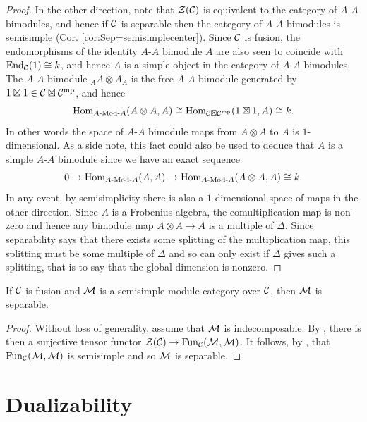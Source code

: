 \documentclass{amsart}
\begin{document}
\begin{proof}
In the other direction, note that $\mathcal Z(\mathcal C)$ is equivalent to the category of $A$-$A$ bimodules, and hence if $\mathcal C$ is separable then the category of $A$-$A$ bimodules is semisimple (Cor. \ref{cor:Sep=semisimplecenter}). 
Since $\mathcal C$ is fusion, the endomorphisms of the identity $A$-$A$ bimodule $A$ are also seen to coincide with $\operatorname{End}_{\mathcal C}(1) \cong k$, and hence $A$ is a simple object in the category of $A$-$A$ bimodules. 
The $A$-$A$ bimodule ${}_AA \otimes A_A$ is the free $A$-$A$ bimodule generated by $1 \boxtimes 1 \in \mathcal C \boxtimes \mathcal C^{\mathrm{mp}}$, and hence
\begin{equation*}
	\Hom_{\Mod{A}{A}}(A \otimes A, A) \cong \Hom_{\cC \boxtimes \cC^\mp}(1 \boxtimes 1, A) \cong k.
\end{equation*}
In other words the space of $A$-$A$ bimodule maps from $A \otimes A$ to $A$ is $1$-dimensional. As a side note, this fact could also be used to deduce that $A$ is a simple $A$-$A$ bimodule since we have an exact sequence
\begin{equation*}
	0 \to \Hom_{\Mod{A}{A}}(A,A) \to \Hom_{\Mod{A}{A}}(A \otimes A, A) \cong k.
\end{equation*}
In any event, by semisimplicity there is also a $1$-dimensional space of maps in the other direction. Since $A$ is a Frobenius algebra, the comultiplication map is non-zero and hence any bimodule map $A \otimes A \rightarrow A$ is a multiple of $\Delta$.  Since separability says that there exists some splitting of the multiplication map, this splitting must be some multiple of $\Delta$ and so can only exist if $\Delta$ gives such a splitting, that is to say that the global dimension is nonzero.
\end{proof}



\begin{theorem} \label{thm:SSModuleCatsAreSep}
If $\mathcal C$ is fusion and $\mathcal M$ is a semisimple module category over $\mathcal C$, then $\mathcal M$ is separable.
\end{theorem}
\begin{proof}
Without loss of generality, assume that $\mathcal M$ is indecomposable.  By \cite[Prop. 3.39]{EO-ftc}, there is then a surjective tensor functor $\mathcal Z(\mathcal C) \rightarrow \operatorname{Fun}_\mathcal C(\mathcal M, \mathcal M)$.  It follows, by \cite[Thm. 2.5]{EO-ftc}, that $\operatorname{Fun}_\mathcal C(\mathcal M, \mathcal M)$ is semisimple and so $\mathcal M$ is separable.
\end{proof}


\section{Dualizability} \label{sec:dualizability}
\end{document}
